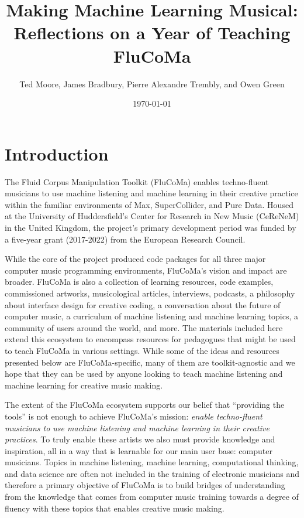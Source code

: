 \documentclass{article}
\title{\textbf{Making Machine Learning Musical: Reflections on a Year of Teaching FluCoMa}}
\author{Ted Moore, James Bradbury, Pierre Alexandre Trembly, and Owen Green}
\date{\today}
\begin{document}
\maketitle
\pagebreak

\tableofcontents
\pagebreak

\section{Introduction}\label{introduction}

The Fluid Corpus Manipulation Toolkit (FluCoMa) enables techno-fluent
musicians to use machine listening and machine learning in their
creative practice within the familiar environments of Max,
SuperCollider, and Pure Data. Housed at the University of Huddersfield's
Center for Research in New Music (CeReNeM) in the United Kingdom, the
project's primary development period was funded by a five-year grant
(2017-2022) from the European Research Council.

While the core of the project produced code packages for all three major
computer music programming environments, FluCoMa's vision and impact are
broader. FluCoMa is also a collection of learning resources, code
examples, commissioned artworks, musicological articles, interviews,
podcasts, a philosophy about interface design for creative coding, a
conversation about the future of computer music, a curriculum of machine
listening and machine learning topics, a community of users around the
world, and more. The materials included here extend this ecosystem to
encompass resources for pedagogues that might be used to teach FluCoMa
in various settings. While some of the ideas and resources presented
below are FluCoMa-specific, many of them are toolkit-agnostic and we
hope that they can be used by anyone looking to teach machine listening
and machine learning for creative music making.

The extent of the FluCoMa ecosystem supports our belief that ``providing
the tools'' is not enough to achieve FluCoMa's mission: \emph{enable
techno-fluent musicians to use machine listening and machine learning in
their creative practices}. To truly enable these artists we also must
provide knowledge and inspiration, all in a way that is learnable for
our main user base: computer musicians. Topics in machine listening,
machine learning, computational thinking, and data science are often not
included in the training of electronic musicians and therefore a primary
objective of FluCoMa is to build bridges of understanding from the
knowledge that comes from computer music training towards a degree of fluency
with these topics that enables creative music making.
\end{document}
